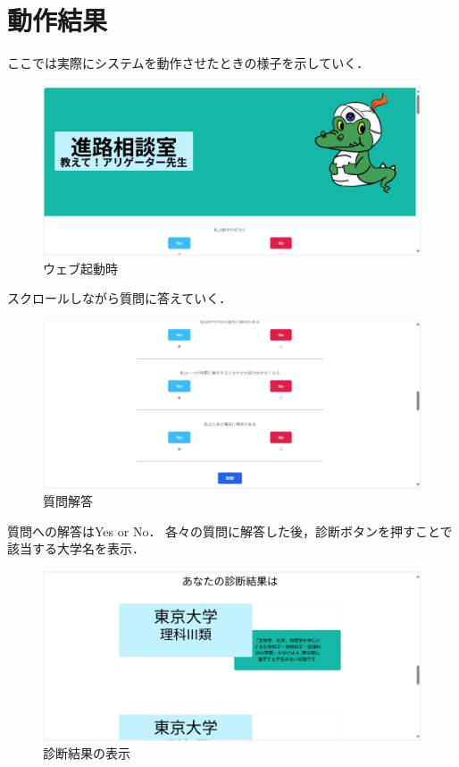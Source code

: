 \documentclass[a4j, titlepage]{jarticle}
\begin{document}
\section{動作結果}
ここでは実際にシステムを動作させたときの様子を示していく．

\begin{figure}[h]
  \centering
\includegraphics[scale=0.20]{dousakekka-1.png}
\caption{ウェブ起動時}
\end{figure}

スクロールしながら質問に答えていく．

\begin{figure}[h]
  \centering
\includegraphics[scale=0.20]{dousakekka-2.png}
\caption{質問解答}
\end{figure}

質問への解答はYes or No．
各々の質問に解答した後，診断ボタンを押すことで該当する大学名を表示．

\begin{figure}[h]
  \centering
\includegraphics[scale=0.20]{dousakekka-3.png}
\caption{診断結果の表示}
\end{figure}
\end{document}
